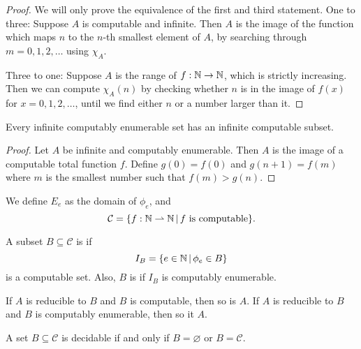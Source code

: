 \begin{proof}
  We will only prove the equivalence of the first and third statement.
  One to three:
  Suppose $A$ is computable and infinite.
  Then $A$ is the image of the function which maps $n$ to the $n$-th smallest
  element of $A$, by searching through $m = 0, 1, 2, \ldots$ using $\chi_A$.

  Three to one:
  Suppose $A$ is the range of $f: \mathbb{N} \to \mathbb{N}$, which is strictly increasing.
  Then we can compute $\chi_A(n)$ by checking whether $n$ is in the image
  of $f(x)$ for $x = 0, 1, 2, \ldots$, until we find either $n$ or a number
  larger than it.
\end{proof}


\begin{corollary}
  Every infinite computably enumerable set has an infinite computable subset.
\end{corollary}

\begin{proof}
  Let $A$ be infinite and computably enumerable.
  Then $A$ is the image of a computable total function $f$.
  Define $g(0) = f(0)$ and $g(n+1) = f(m)$ where $m$ is the smallest number such
  that $f(m) > g(n)$.
\end{proof}

We define $E_e$ as the domain of $\phi_e$, and
\[
  \mathcal{C} = \{ f: \mathbb{N} \rightharpoonup \mathbb{N} \,|\, \text{$f$ is computable} \}.
\]

\begin{definition}
  A subset $B \subseteq \mathcal{C}$ is  if
  \[
	I_B = \{ e \in \mathbb{N} \,|\, \phi_e \in B \}
  \]
  is a computable set.
  Also, $B$ is  if $I_B$ is computably enumerable.
\end{definition}

\begin{lemma}
  If $A$ is reducible to $B$ and $B$ is computable, then so is $A$.
  If $A$ is reducible to $B$ and $B$ is computably enumerable, then so it $A$.
\end{lemma}


\begin{theorem}[Rice]
  A set $B \subseteq \mathcal{C}$ is decidable if and only if $B = \varnothing$
  or $B = \mathcal{C}$.
\end{theorem}

